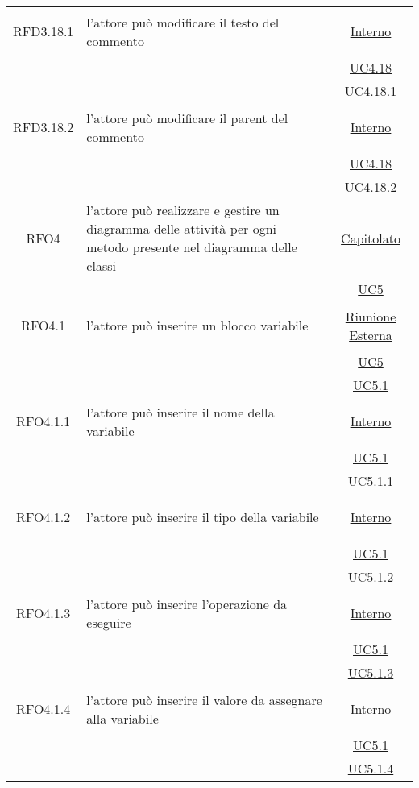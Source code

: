 \begin{longtable}{|c|>{\centering}m{7cm}|c|}
\hypertarget{RFD3.18.1}{RFD3.18.1} & l'attore può modificare il testo del commento &  \hyperlink{Interno}{Interno}\\
& &\hyperref[UC4.18]{UC4.18}\\
& &\hyperref[UC4.18.1]{UC4.18.1}\\ \hline

\hypertarget{RFD3.18.2}{RFD3.18.2} & l'attore può modificare il parent del commento &  \hyperlink{Interno}{Interno}\\
& &\hyperref[UC4.18]{UC4.18}\\
& &\hyperref[UC4.18.2]{UC4.18.2}\\ \hline

\hypertarget{RFO4}{RFO4} & l'attore può realizzare e gestire un diagramma delle attività per ogni metodo presente nel diagramma delle classi & \hyperlink{Capitolato}{Capitolato}\\
& & \hyperref[UC5]{UC5}\\ \hline

\hypertarget{RFO4.1}{RFO4.1} & l'attore può inserire un blocco variabile &  \hyperlink{Riunione Esterna}{Riunione Esterna}\\
& &\hyperref[UC5]{UC5}\\
& &\hyperref[UC5.1]{UC5.1}\\ \hline

\hypertarget{RFO4.1.1}{RFO4.1.1} & l'attore può inserire il nome della variabile & \hyperlink{Interno}{Interno}\\
& &\hyperref[UC5.1]{UC5.1}\\
& &\hyperref[UC5.1.1]{UC5.1.1}\\ \hline

\hypertarget{RFO4.1.2}{RFO4.1.2} & l'attore può inserire il tipo della variabile & \hyperlink{Interno}{Interno}\\
& &\hyperref[UC5.1]{UC5.1}\\
& &\hyperref[UC5.1.2]{UC5.1.2}\\ \hline

\hypertarget{RFO4.1.3}{RFO4.1.3} & l'attore può inserire l'operazione da eseguire & \hyperlink{Interno}{Interno}\\
& &\hyperref[UC5.1]{UC5.1}\\
& &\hyperref[UC5.1.3]{UC5.1.3}\\ \hline

\hypertarget{RFO4.1.4}{RFO4.1.4} & l'attore può inserire il valore da assegnare alla variabile &\hyperlink{Interno}{Interno}\\
& &\hyperref[UC5.1]{UC5.1}\\
& &\hyperref[UC5.1.4]{UC5.1.4}\\ \hline


\end{longtable}
